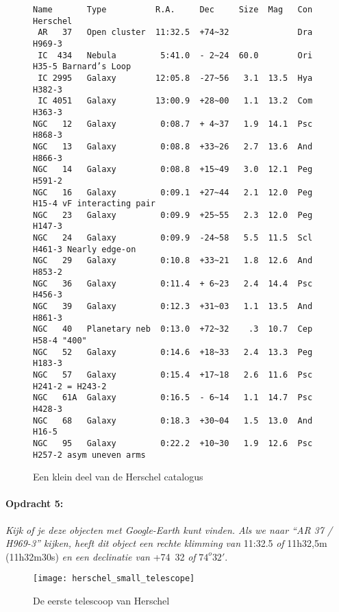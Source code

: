 \begin{figure}[h]
\begin{verbatim}
Name       Type          R.A.     Dec     Size  Mag   Con  Herschel
 AR   37   Open cluster  11:32.5  +74~32              Dra  H969-3
 IC  434   Nebula         5:41.0  - 2~24  60.0        Ori  H35-5 Barnard’s Loop
 IC 2995   Galaxy        12:05.8  -27~56   3.1  13.5  Hya  H382-3
 IC 4051   Galaxy        13:00.9  +28~00   1.1  13.2  Com  H363-3
NGC   12   Galaxy         0:08.7  + 4~37   1.9  14.1  Psc  H868-3
NGC   13   Galaxy         0:08.8  +33~26   2.7  13.6  And  H866-3
NGC   14   Galaxy         0:08.8  +15~49   3.0  12.1  Peg  H591-2
NGC   16   Galaxy         0:09.1  +27~44   2.1  12.0  Peg  H15-4 vF interacting pair
NGC   23   Galaxy         0:09.9  +25~55   2.3  12.0  Peg  H147-3
NGC   24   Galaxy         0:09.9  -24~58   5.5  11.5  Scl  H461-3 Nearly edge-on
NGC   29   Galaxy         0:10.8  +33~21   1.8  12.6  And  H853-2
NGC   36   Galaxy         0:11.4  + 6~23   2.4  14.4  Psc  H456-3
NGC   39   Galaxy         0:12.3  +31~03   1.1  13.5  And  H861-3
NGC   40   Planetary neb  0:13.0  +72~32    .3  10.7  Cep  H58-4 "400"
NGC   52   Galaxy         0:14.6  +18~33   2.4  13.3  Peg  H183-3
NGC   57   Galaxy         0:15.4  +17~18   2.6  11.6  Psc  H241-2 = H243-2
NGC   61A  Galaxy         0:16.5  - 6~14   1.1  14.7  Psc  H428-3
NGC   68   Galaxy         0:18.3  +30~04   1.5  13.0  And  H16-5
NGC   95   Galaxy         0:22.2  +10~30   1.9  12.6  Psc  H257-2 asym uneven arms
\end{verbatim}
\caption{Een klein deel van de Herschel catalogus}
\end{figure}



\paragraph*{Opdracht 5:}

\emph{Kijk of je deze objecten met Google-Earth kunt vinden. Als we
naar ``AR 37 / H969-3'' kijken, heeft dit object een rechte klimming
van} 11:32.5 \emph{of} 11h32,5m (11h32m30s) \emph{en een declinatie
van} +74~32 \emph{of }$74^{o}32'$.

\begin{figure}[h]
\noindent \begin{centering}
\texttt{[image: herschel\_small\_telescope]}
\par\end{centering}

\caption{De eerste telescoop van Herschel\cite{herschel}}
\end{figure}

